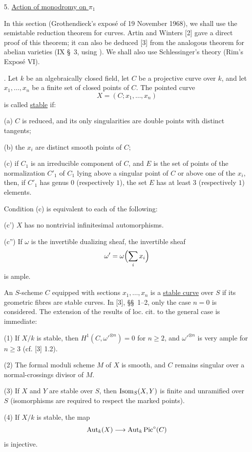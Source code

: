 
5. \underline{Action of monodromy on $\pi_1$}

In this section (Grothendieck's expos\'{e} of 19 November 1968), we
shall use the semistable reduction theorem for curves. Artin and Winters
[2] gave a direct proof of this theorem; it can also be deduced [3] from
the analogous theorem for abelian varieties (IX \S~3, using ). We
shall also use Schlessinger's theory (Rim's Expos\'{e} VI).

. Let $k$ be an algebraically closed field, let $C$ be a projective
curve over $k$, and let $x_1,\ldots,x_n$ be a finite set of closed points
of $C$. The pointed curve
\[
X=(C;x_1,\ldots,x_n)
\]
is called \underline{stable} if:

(a) $C$ is reduced, and its only singularities are double points with
distinct tangents;

(b) the $x_i$ are distinct smooth points of $C$;

(c) if $C_1$ is an irreducible component of $C$, and $E$ is the set of
points of the normalization $C'_1$ of $C_1$ lying above a singular point
of $C$ or above one of the $x_i$, then, if $C'_1$ has genus $0$
(respectively $1$), the set $E$ has at least $3$ (respectively $1$)
elements.

Condition (c) is equivalent to each of the following:

(c') $X$ has no nontrivial infinitesimal automorphisms.

(c'') If $\omega$ is the invertible dualizing sheaf, the invertible
sheaf
\[
\omega'=\omega\Bigl(\sum_i x_i\Bigr)
\]
is ample.

An $S$-scheme $C$ equipped with sections $x_1,\ldots,x_n$ is a
\underline{stable curve} over $S$ if its geometric fibres are stable
curves. In [3], \S\S~1--2, only the case $n=0$ is considered. The
extension of the results of loc. cit. to the general case is immediate:

(1) If $X/k$ is stable, then
$H^1(C,\omega'^{\otimes n})=0$ for $n\geqslant2$, and
$\omega'^{\otimes n}$ is very ample for $n\geqslant3$ (cf. [3] 1.2).

(2) The formal moduli scheme $M$ of $X$ is smooth, and $C$ remains
singular over a normal-crossings divisor of $M$.


(3) If $X$ and $Y$ are stable over $S$, then $\operatorname{Isom}_S(X,Y)$ is finite
and unramified over $S$ (isomorphisms are required to respect the marked
points).

(4) If $X/k$ is stable, the map
\[
\operatorname{Aut}_k(X)\longrightarrow\operatorname{Aut}_k\operatorname{Pic}^\circ(C)
\]
is injective.

